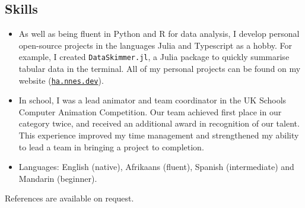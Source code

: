 \documentclass[11pt, a4paper]{article}
\begin{document}
\subsection*{Skills}

\begin{itemize}
	\item As well as being fluent in Python and R for data analysis, I develop personal open-source projects in the languages Julia and Typescript as a hobby.
	For example, I created \texttt{DataSkimmer.jl}, a Julia package to quickly summarise tabular data in the terminal.
	All of my personal projects can be found on my website (\href{https://ha.nnes.dev/}{\nolinkurl{ha.nnes.dev}}).
	
	\item In school, I was a lead animator and team coordinator in the UK Schools Computer Animation Competition.
	Our team achieved first place in our category twice, and received an additional award in recognition of our talent.
	This experience improved my time management and strengthened my ability to lead a team in bringing a project to completion.
	
	\item Languages: English (native), Afrikaans (fluent), Spanish (intermediate) and Mandarin (beginner).
\end{itemize}

\noindent References are available on request.
\end{document}
